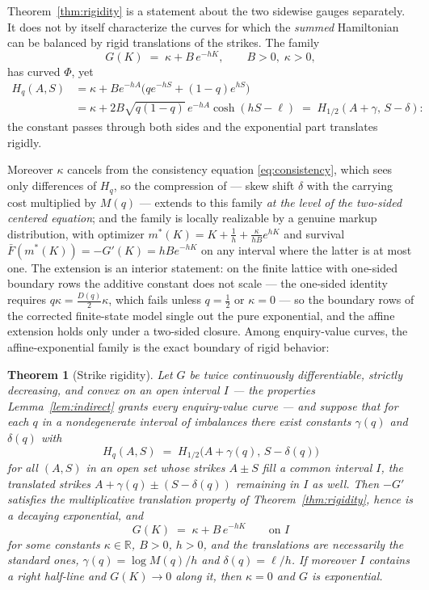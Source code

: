 \documentclass[11pt]{article}
\newtheorem{theorem}{Theorem}
\newcommand{\Fbar}{\bar F}
\begin{document}
Theorem~\ref{thm:rigidity} is a statement about the two sidewise gauges separately. It does not by itself characterize the curves for which the \emph{summed} Hamiltonian can be balanced by rigid translations of the strikes. The family
\[
G(K) \;=\; \kappa + B\,e^{-hK}, \qquad B > 0, \; \kappa > 0,
\]
has curved $\Phi$, yet
\begin{align*}
H_q(A,S) &= \kappa + B e^{-hA}\big(q e^{-hS} + (1-q)e^{hS}\big) \\
        &= \kappa + 2B\sqrt{q(1-q)}\, e^{-hA}\cosh(hS - \ell)
        \;=\; H_{1/2}(A + \gamma,\, S - \delta):
\end{align*}
the constant passes through both sides and the exponential part translates rigidly.

Moreover $\kappa$ cancels from the consistency equation \eqref{eq:consistency}, which sees only differences of $H_q$, so the compression of \citet{cotton2026skew} --- skew shift $\delta$ with the carrying cost multiplied by $M(q)$ --- extends to this family \emph{at the level of the two-sided centered equation}; and the family is locally realizable by a genuine markup distribution, with optimizer $m^\ast(K) = K + \tfrac1h + \tfrac{\kappa}{hB}e^{hK}$ and survival $\Fbar(m^\ast(K)) = -G'(K) = hBe^{-hK}$ on any interval where the latter is at most one. The extension is an interior statement: on the finite lattice with one-sided boundary rows the additive constant does not scale --- the one-sided identity requires $q\kappa = \tfrac{D(q)}{2}\kappa$, which fails unless $q = \tfrac12$ or $\kappa = 0$ --- so the boundary rows of the corrected finite-state model single out the pure exponential, and the affine extension holds only under a two-sided closure. Among enquiry-value curves, the affine-exponential family is the exact boundary of rigid behavior:

\begin{theorem}[Strike rigidity]\label{thm:hamrigidity}
Let $G$ be twice continuously differentiable, strictly decreasing, and convex on an open interval $I$ --- the properties Lemma~\ref{lem:indirect} grants every enquiry-value curve --- and suppose that for each $q$ in a nondegenerate interval of imbalances there exist constants $\gamma(q)$ and $\delta(q)$ with
\[
H_q(A,S) \;=\; H_{1/2}\big(A + \gamma(q),\, S - \delta(q)\big)
\]
for all $(A,S)$ in an open set whose strikes $A \pm S$ fill a common interval $I$, the translated strikes $A + \gamma(q) \pm (S - \delta(q))$ remaining in $I$ as well. Then $-G'$ satisfies the multiplicative translation property of Theorem~\ref{thm:rigidity}, hence is a decaying exponential, and
\[
G(K) \;=\; \kappa + B\,e^{-hK} \qquad\text{on } I
\]
for some constants $\kappa \in \mathbb R$, $B > 0$, $h > 0$, and the translations are necessarily the standard ones, $\gamma(q) = \log M(q)/h$ and $\delta(q) = \ell/h$. If moreover $I$ contains a right half-line and $G(K) \to 0$ along it, then $\kappa = 0$ and $G$ is exponential.
\end{theorem}
\end{document}
